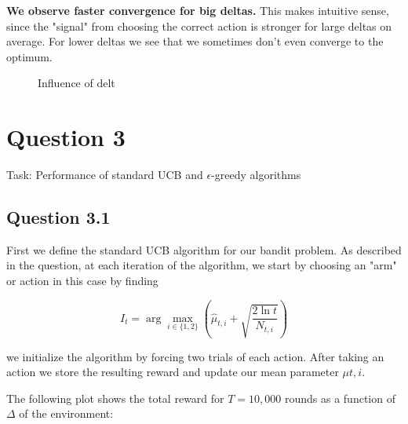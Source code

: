 \documentclass[a4paper, 11pt]{article} %
\begin{document}
\textbf{We observe faster convergence for big deltas.} This makes intuitive sense, since the "signal" from choosing the correct action is stronger for large deltas on average. For lower deltas we see that we sometimes don't even converge to the optimum.

   \begin{figure}[!htb]
        \caption{\label{fig:my-label} Influence of delt}
      \end{figure}

\newpage

\section*{Question 3}

Task: Performance of standard UCB and $\epsilon$-greedy algorithms

\subsection*{Question 3.1}

First we define the standard UCB algorithm for our bandit problem. As described in the question, at each iteration of the algorithm, we start by choosing an "arm" or action in this case by finding

$$I_{t}=\arg \max _{i \in\{1,2\}}\left(\widehat{\mu}_{t, i}+\sqrt{\frac{2 \ln t}{N_{t, i}}}\right)$$

we initialize the algorithm by forcing two trials of each action. After taking an action we store the resulting reward and update our mean parameter $\mu{t,i}$.

The following plot shows the total reward for $T=10,000$ rounds as a function of $\Delta$ of the environment:
\end{document}
